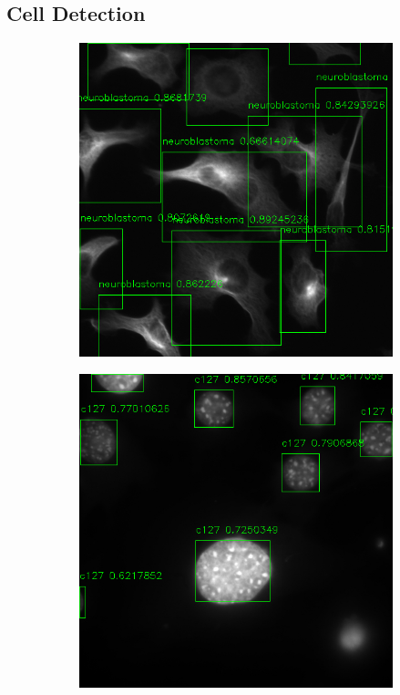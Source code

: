\documentclass[10pt, journal, compsoc]{IEEEtran}
\begin{document}
\subsection{Cell Detection}
\begin{figure}
\centering
\begin{subfigure}[b]{0.49\linewidth}
\includegraphics[width=\linewidth]{110084.png}
\end{subfigure}
\begin{subfigure}[b]{0.49\linewidth}
\includegraphics[width=\linewidth]{c127/yolo/108636.png}

\end{subfigure}
\end{figure}
\end{document}

